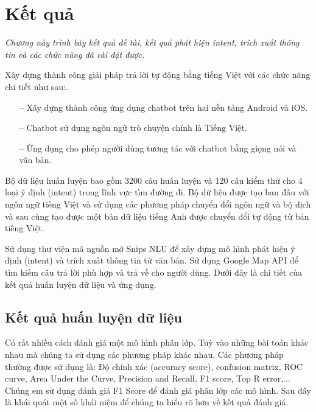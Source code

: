 \chapter{Kết quả}
\label{Chapter6}

\emph{Chương này trình bày kết quả đề tài, kết quả phát hiện intent, trích xuất thông tin và các chức năng đã cài đặt được.}


Xây dựng thành công giải pháp trả lời tự động bằng tiếng Việt với các chức năng chi tiết như sau:.
\begin{itemize}
    \item[--] Xây dựng thành công ứng dụng chatbot trên hai nền tảng Android và iOS.
    \item[--] Chatbot sử dụng ngôn ngữ trò chuyện chính là Tiếng Việt.
    \item[--] Ứng dụng cho phép người dùng tương tác với chatbot bằng giọng nói và văn bản.
\end{itemize}

Bộ dữ liệu huấn luyện bao gồm 3200 câu huấn luyện và 120 câu kiểm thử cho 4 loại ý định (intent) trong lĩnh vực tìm đường đi. Bộ dữ liệu được tạo ban đầu với ngôn ngữ tiếng Việt và sử dụng các phương pháp chuyển đổi ngôn ngữ và bộ dịch và sau cùng tạo được một bản dữ liệu tiếng Anh được chuyển đổi tự động từ bản tiếng Việt.  

Sử dụng thư viện mã nguồn mở Snips NLU\cite{Snipsnlu} để xây dựng mô hình phát hiện ý định (intent) và trích xuất thông tin từ văn bản. Sử dụng Google Map API\cite{ggmaps} để tìm kiếm câu trả lời phù hợp và trả về cho người dùng. Dưới đây là chi tiết của kết quả huấn luyện dữ liệu và ứng dụng.

\section{Kết quả huấn luyện dữ liệu}

Có rất nhiều cách đánh giá một mô hình phân lớp. Tuỳ vào những bài toán khác nhau mà chúng ta sử dụng các phương pháp khác nhau. Các phương pháp thường được sử dụng là: Độ chính xác (accuracy score), confusion matrix, ROC curve, Area Under the Curve, Precision and Recall, F1 score, Top R error,... Chúng em sử dụng đánh giá F1 Score để đánh giá phân lớp các mô hình. Sau đây là khái quát một số khái niệm để chúng ta hiểu rõ hơn về kết quả đánh giá.

